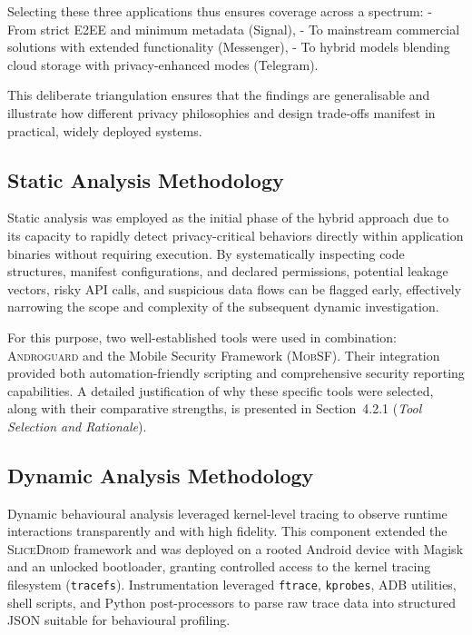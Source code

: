 \documentclass[a4paper,12pt]{report}
\begin{document}
Selecting these three applications thus ensures coverage across a spectrum:
- From strict E2EE and minimum metadata (Signal),
- To mainstream commercial solutions with extended functionality (Messenger),
- To hybrid models blending cloud storage with privacy-enhanced modes (Telegram).

This deliberate triangulation ensures that the findings are generalisable and illustrate how different privacy philosophies and design trade-offs manifest in practical, widely deployed systems.

\subsection{Static Analysis Methodology}

Static analysis was employed as the initial phase of the hybrid approach due to its capacity to rapidly detect privacy-critical behaviors directly within application binaries without requiring execution. By systematically inspecting code structures, manifest configurations, and declared permissions, potential leakage vectors, risky API calls, and suspicious data flows can be flagged early, effectively narrowing the scope and complexity of the subsequent dynamic investigation.

For this purpose, two well-established tools were used in combination: \textsc{Androguard} and the Mobile Security Framework (\textsc{MobSF}). Their integration provided both automation-friendly scripting and comprehensive security reporting capabilities. A detailed justification of why these specific tools were selected, along with their comparative strengths, is presented in Section~4.2.1 (\emph{Tool Selection and Rationale}).

\subsection{Dynamic Analysis Methodology}

Dynamic behavioural analysis leveraged kernel-level tracing to observe runtime interactions transparently and with high fidelity. This component extended the \textsc{SliceDroid} framework and was deployed on a rooted Android device with Magisk and an unlocked bootloader, granting controlled access to the kernel tracing filesystem (\texttt{tracefs}). Instrumentation leveraged \texttt{ftrace}, \texttt{kprobes}, ADB utilities, shell scripts, and Python post-processors to parse raw trace data into structured JSON suitable for behavioural profiling.
\end{document}
